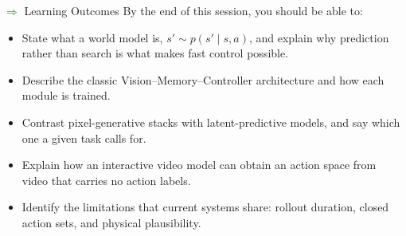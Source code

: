 \begin{frame}[allowframebreaks]{\textcolor{green}{$\Rightarrow$} Learning Outcomes}
  By the end of this session, you should be able to:
  \begin{itemize}\itemsep0.24em
    \item[\textcolor{red}{$\blacktriangleright$}] State what a world model is, $s' \sim p(s' \mid s, a)$, and explain why prediction rather than search is what makes fast control possible.
    \item[\textcolor{red}{$\blacktriangleright$}] Describe the classic Vision--Memory--Controller architecture and how each module is trained.
    \item[\textcolor{red}{$\blacktriangleright$}] Contrast pixel-generative stacks with latent-predictive models, and say which one a given task calls for.
    \item[\textcolor{red}{$\blacktriangleright$}] Explain how an interactive video model can obtain an action space from video that carries no action labels.
    \item[\textcolor{red}{$\blacktriangleright$}] Identify the limitations that current systems share: rollout duration, closed action sets, and physical plausibility.
  \end{itemize}
\end{frame}
